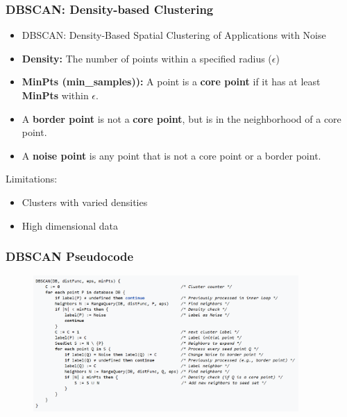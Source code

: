 \documentclass[aspectratio=169, 10pt]{beamer}
\begin{document}
\begin{frame}
    \frametitle{DBSCAN: Density-based Clustering}
    
    \begin{itemize}
        \item DBSCAN: Density-Based Spatial Clustering of Applications with Noise
        \item \textbf{Density:} The number of points within a specified radius ($\epsilon$)
        \item \textbf{MinPts (min\_samples)):} A point is a \textbf{core point} if it has at least \textbf{MinPts} within $\epsilon$.
        \item A \textbf{border point} is not a \textbf{core point}, but is in the neighborhood of a core point.
        \item A \textbf{noise point} is any point that is not a core point or a border point.
    \end{itemize}

    Limitations:
    \begin{itemize}
        \item Clusters with varied densities
        \item High dimensional data
    \end{itemize}
    
\end{frame}

\begin{frame}
    \frametitle{DBSCAN Pseudocode}
    
    \begin{figure}
        \centering
        \includegraphics[width=0.9\textwidth]{../imgs/dbscan.png}
    \end{figure}
    
\end{frame}
\end{document}
